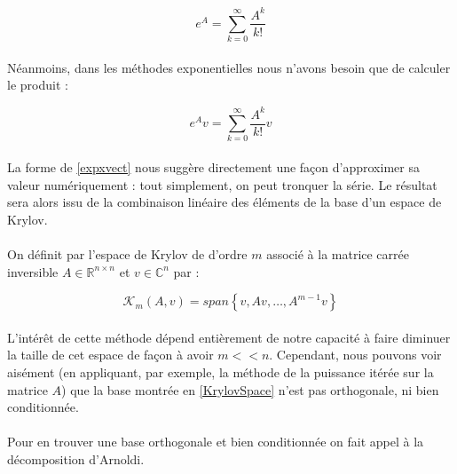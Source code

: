 \begin{equation} 
    e^{A}=\sum_{k=0}^{\infty} \frac{A^{k}}{k !}
\end{equation}

\paragraph{}
Néanmoins, dans les méthodes exponentielles nous n'avons besoin que de calculer le produit : 

\begin{equation} 
    e^{A}v=\sum_{k=0}^{\infty} \frac{A^{k}}{k !}v
    \label{expxvect}
\end{equation}

\paragraph{}
La forme de \ref{expxvect} nous suggère directement une façon d'approximer sa valeur numériquement : tout simplement, on peut tronquer la série. Le résultat sera alors issu de la combinaison linéaire des éléments de la base d'un espace de Krylov.

\paragraph{}
On définit par l'espace de Krylov de d'ordre $m$ associé à la matrice carrée inversible $A \in \mathbb{R}^{n \times n}$ et $v \in \mathbb{C}^{n}$ par :

\begin{equation} 
    \mathcal{K}_{m}(A, v)=s p a n \left\{v, A v, \ldots, A^{m-1} v\right\}
    \label{KrylovSpace}
\end{equation}

\paragraph{}
L'intérêt de cette méthode dépend entièrement de notre capacité à faire diminuer la taille de cet espace de façon à avoir $m<<n$. Cependant, nous pouvons voir aisément (en appliquant, par exemple, la méthode de la puissance itérée sur la matrice $A$) que la base montrée en \ref{KrylovSpace} n'est pas orthogonale, ni bien conditionnée. 

\paragraph{}
Pour en trouver une base orthogonale et bien conditionnée on fait appel à la décomposition d'Arnoldi.

